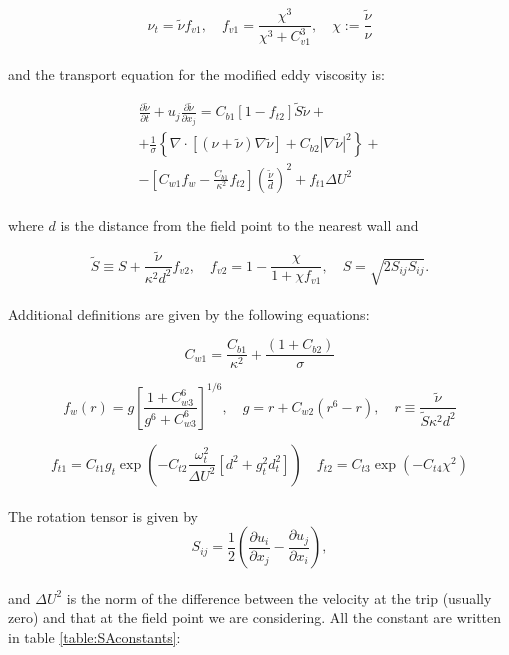 \documentclass[a5paper]{sapthesis}
\begin{document}
	\begin{equation}
		\nu_t = \tilde{\nu} f_{v1}, \quad f_{v1} = \frac{\chi^3}{\chi^3 + C_{v1}^3}, \quad \chi := \frac{\tilde{\nu}}{\nu}
	\end{equation}
	\\
	and the transport equation for the modified eddy viscosity is:
	
	\begin{equation}
		\begin{aligned}
			\frac{\partial \tilde{\nu}}{\partial t} + u_j \frac{\partial \tilde{\nu}}{\partial x_j} = C_{b1} [1 - f_{t2}] \tilde{S} \tilde{\nu}+ \\ 
			+ \frac{1}{\sigma} \left\{ \nabla \cdot [( \nu + \tilde{\nu}) \nabla \tilde{\nu}] + C_{b2} | \nabla \tilde{\nu} |^2 \right\} +\\
			- \left[ C_{w1} f_w - \frac{C_{b1}}{\kappa^2} f_{t2} \right] \left( \frac{\tilde{\nu}}{d} \right)^2 + f_{t1} \Delta U^2
		\end{aligned}
	\end{equation}
	\\
	where $d$ is the distance from the field point to the nearest wall and
	
	\begin{equation}
		\tilde{S} \equiv S + \frac{\tilde{\nu}}{\kappa^2 d^2} f_{v2}, \quad f_{v2} = 1 - \frac{\chi}{1 + \chi f_{v1}}, \quad  S = \sqrt{2 S_{ij} S_{ij}}.
	\end{equation}
	\\
	Additional definitions are given by the following equations: 
	
	\begin{equation}
		C_{w1} = \frac{C_{b1}}{\kappa^2} + \frac{(1 + C_{b2})}{\sigma}
	\end{equation}
	
	\begin{equation}
		f_w (r)= g \left[ \frac{1 + C_{w3}^6}{g^6 + C_{w3}^6} \right]^{1/6}, \quad g = r + C_{w2} (r^6 - r), \quad r \equiv \frac{\tilde{\nu}}{\tilde{S} \kappa^2 d^2}
	\end{equation}
	
	\begin{equation}
		f_{t1} = C_{t1} g_t \exp \left( -C_{t2} \frac{\omega_t^2}{\Delta U^2} [d^2 + g_t^2 d_t^2] \right) \quad f_{t2} = C_{t3} \exp(-C_{t4} \chi^2)
	\end{equation}
	\\
	The rotation tensor is given by
	\begin{equation}
		S_{ij} = \frac{1}{2} \left ( \frac{\partial{u_i}}{\partial{x_j}} - \frac{\partial{u_j}}{\partial{x_i}}\right ),
	\end{equation}
	\\
	and $\Delta{U^2}$ is the norm of the difference between the velocity at the trip (usually zero) and that at the field point we are considering. 
	All the constant are written in table \ref{table:SAconstants}:
	
\end{document}
